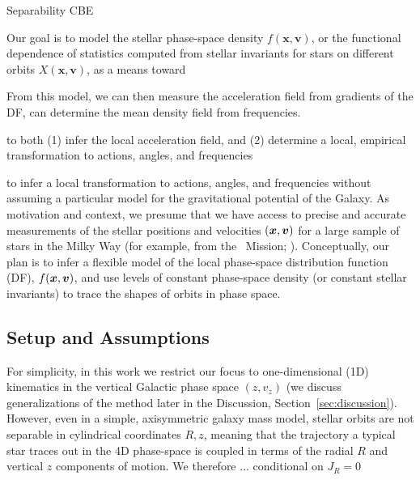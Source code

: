 Separability
CBE

Our goal is to model the stellar phase-space density
$f(\boldsymbol{x}, \boldsymbol{v})$, or the functional dependence of statistics computed
from stellar invariants for stars on different orbits $X(\boldsymbol{x},
\boldsymbol{v})$, as a means toward

From this model, we can then measure the acceleration field from gradients of the DF, can determine the mean density field from frequencies.

to both (1) infer the local acceleration field, and (2) determine a local, empirical transformation to actions, angles, and frequencies

to infer a local transformation to actions, angles,
and frequencies without assuming a particular model for the gravitational potential of
the Galaxy.
As motivation and context, we presume that we have access to precise and accurate
measurements of the stellar positions and velocities $(\boldsymbol{x}, \boldsymbol{v})$ for a large
sample of stars in the Milky Way (for example, from the \gaia\ Mission; \citealt{TODO}).
Conceptually, our plan is to infer a flexible model of the local phase-space
distribution function (DF), $f(\boldsymbol{x}, \boldsymbol{v})$, and use levels of constant phase-space
density (or constant stellar invariants) to trace the shapes of orbits in phase space.


\subsection{Setup and Assumptions} \label{sec:methods-setup}

For simplicity, in this work we restrict our focus to one-dimensional (1D) kinematics in
the vertical Galactic phase space $(z, v_z)$ (we discuss generalizations of the method
later in the Discussion, Section~\ref{sec:discussion}). %
However, even in a simple, axisymmetric galaxy mass model, stellar orbits are not
separable in cylindrical coordinates $R, z$, meaning that the trajectory a typical star
traces out in the 4D phase-space is coupled in terms of the radial $R$ and vertical $z$
components of motion.
We therefore ... conditional on $J_R=0$


